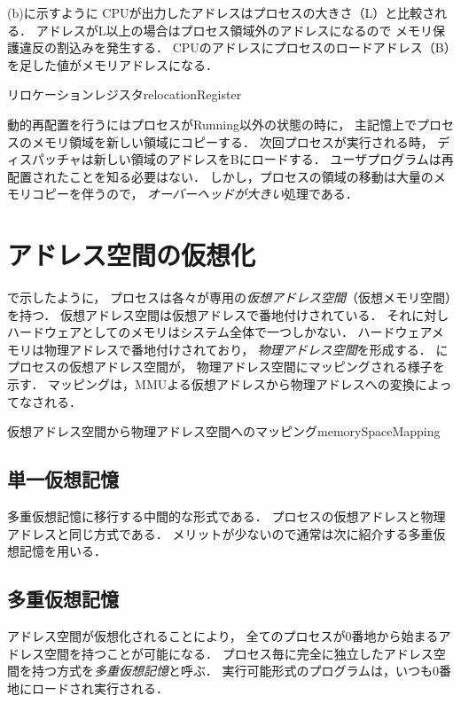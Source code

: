 (b)に示すように
CPUが出力したアドレスはプロセスの大きさ（L）と比較される．
アドレスがL以上の場合はプロセス領域外のアドレスになるので
メモリ保護違反の割込みを発生する．
CPUのアドレスにプロセスのロードアドレス（B）を足した値がメモリアドレスになる．

{リロケーションレジスタ}{relocationRegister}

動的再配置を行うにはプロセスがRunning以外の状態の時に，
主記憶上でプロセスのメモリ領域を新しい領域にコピーする．
次回プロセスが実行される時，
ディスパッチャは新しい領域のアドレスをBにロードする．
ユーザプログラムは再配置されたことを知る必要はない．
しかし，プロセスの領域の移動は大量のメモリコピーを伴うので，
\emph{オーバーヘッドが大きい}処理である．

\section{アドレス空間の仮想化}
で示したように，
プロセスは各々が専用の\emph{仮想アドレス空間}（仮想メモリ空間）を持つ．
仮想アドレス空間は仮想アドレスで番地付けされている．
それに対しハードウェアとしてのメモリはシステム全体で一つしかない．
ハードウェアメモリは物理アドレスで番地付けされており，
\emph{物理アドレス空間}を形成する．
にプロセスの仮想アドレス空間が，
物理アドレス空間にマッピングされる様子を示す．
マッピングは，MMUよる仮想アドレスから物理アドレスへの変換によってなされる．

{仮想アドレス空間から物理アドレス空間へのマッピング}{memorySpaceMapping}

\subsection{単一仮想記憶}
多重仮想記憶に移行する中間的な形式である．
プロセスの仮想アドレスと物理アドレスと同じ方式である．
メリットが少ないので通常は次に紹介する多重仮想記憶を用いる．

\subsection{多重仮想記憶}
アドレス空間が仮想化されることにより，
全てのプロセスが0番地から始まるアドレス空間を持つことが可能になる．
プロセス毎に完全に独立したアドレス空間を持つ方式を\emph{多重仮想記憶}と呼ぶ．
実行可能形式のプログラムは，いつも0番地にロードされ実行される．

